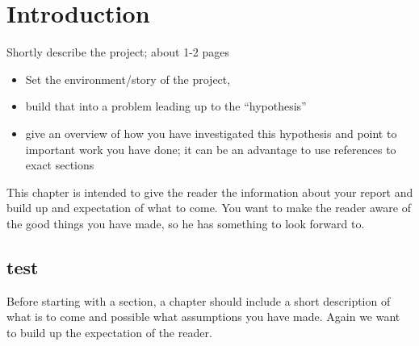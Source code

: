 \chapter{Introduction}
Shortly describe the project; about 1-2 pages
\begin{itemize}
  \item Set the environment/story of the project,
  \item build that into a problem leading up to the ``hypothesis''
  \item give an overview of how you have investigated this hypothesis and point to important work you have done; it can be an advantage to use references to exact sections
\end{itemize}

This chapter is intended to give the reader the information about your report and build up and expectation of what to come. You want to make the reader aware of the good things you have made, so he has something to look forward to.
\section{test}
Before starting with a section, a chapter should include a short description of what is to come and possible what assumptions you have made. Again we want to build up the expectation of the reader.
